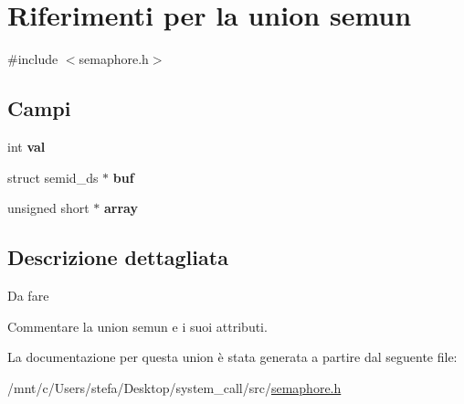 \hypertarget{unionsemun}{}\section{Riferimenti per la union semun}
\label{unionsemun}


{\ttfamily \#include $<$semaphore.\+h$>$}

\subsection*{Campi}
\begin{DoxyCompactItemize}
\item 
\mbox{\label{unionsemun_ac6121ecb6d04a024e07e12bd71b94031}} 
int {\bfseries val}
\item 
\mbox{\label{unionsemun_ac6b6428d07d4147fd2cc698b53555bed}} 
struct semid\+\_\+ds $\ast$ {\bfseries buf}
\item 
\mbox{\label{unionsemun_aca23b8e730a0553205813c0cb7692b54}} 
unsigned short $\ast$ {\bfseries array}
\end{DoxyCompactItemize}


\subsection{Descrizione dettagliata}
\begin{DoxyRefDesc}{Da fare}
\item[\hyperlink{todo__todo000007}{Da fare}]Commentare la union semun e i suoi attributi. \end{DoxyRefDesc}


La documentazione per questa union è stata generata a partire dal seguente file\+:\begin{DoxyCompactItemize}
\item 
/mnt/c/\+Users/stefa/\+Desktop/system\+\_\+call/src/\hyperlink{semaphore_8h}{semaphore.\+h}\end{DoxyCompactItemize}

